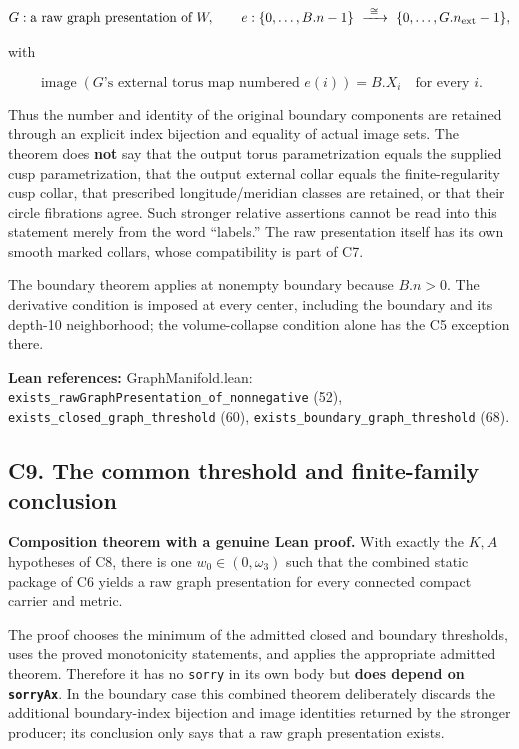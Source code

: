\documentclass[
  letterpaper,
  11pt]{article}
\begin{document}
\[
 G:\text{a raw graph presentation of }W,
 \qquad e:\{0,\ldots,B.n-1\}\ \xrightarrow{\ \cong\ }\ \relax
 \{0,\ldots,G.n_{\rm ext}-1\},
\]

with

\[
 \operatorname{image}(G\text{'s external torus map numbered }e(i))=B.X_i
 \quad\text{for every }i.
\]

Thus the number and identity of the original boundary components are
retained through an explicit index bijection and equality of actual
image sets. The theorem does \textbf{not} say that the output torus
parametrization equals the supplied cusp parametrization, that the
output external collar equals the finite-regularity cusp collar, that
prescribed longitude/meridian classes are retained, or that their circle
fibrations agree. Such stronger relative assertions cannot be read into
this statement merely from the word ``labels.'' The raw presentation
itself has its own smooth marked collars, whose compatibility is part of
C7.

The boundary theorem applies at nonempty boundary because \(B.n>0\). The
derivative condition is imposed at every center, including the boundary
and its depth-10 neighborhood; the volume-collapse condition alone has
the C5 exception there.

\textbf{Lean references:} GraphManifold.lean:
{\small\texttt{exists\_\allowbreak{}raw\allowbreak{}Graph\allowbreak{}Presentation\_\allowbreak{}of\_\allowbreak{}nonnegative}}
(52),
{\small\texttt{exists\_\allowbreak{}closed\_\allowbreak{}graph\_\allowbreak{}threshold}}
(60),
{\small\texttt{exists\_\allowbreak{}boundary\_\allowbreak{}graph\_\allowbreak{}threshold}}
(68).

\subsection{C9. The common threshold and finite-family
conclusion}\label{collapse-composition}

\textbf{Composition theorem with a genuine Lean proof.} With exactly the
\(K,A\) hypotheses of C8, there is one \(w_0\in(0,\omega_3)\) such that
the combined static package of C6 yields a raw graph presentation for
every connected compact carrier and metric.

The proof chooses the minimum of the admitted closed and boundary
thresholds, uses the proved monotonicity statements, and applies the
appropriate admitted theorem. Therefore it has no {\small\texttt{sorry}}
in its own body but \textbf{does depend on
{\small\texttt{sorry\allowbreak{}Ax}}}. In the boundary case this
combined theorem deliberately discards the additional boundary-index
bijection and image identities returned by the stronger producer; its
conclusion only says that a raw graph presentation exists.
\end{document}
